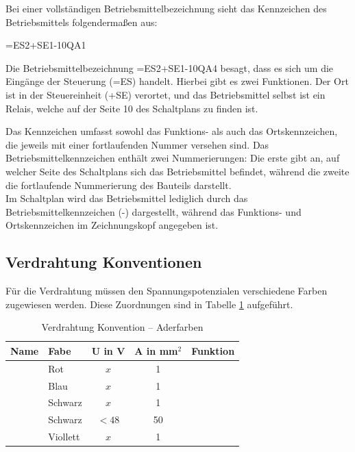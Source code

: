 Bei einer vollständigen Betriebsmittelbezeichnung sieht das Kennzeichen des Betriebsmittels folgendermaßen aus:

\begin{center} =ES2+SE1-10QA1 \end{center}

Die Betriebsmittelbezeichnung =ES2+SE1-10QA4 besagt, dass es sich um die Eingänge der Steuerung (=ES) handelt. Hierbei gibt es zwei Funktionen. Der Ort ist in der Steuereinheit (+SE) verortet, und das Betriebsmittel selbst ist ein Relais, welche auf der Seite 10 des Schaltplans zu finden ist.

Das Kennzeichen umfasst sowohl das Funktions- als auch das Ortskennzeichen, die jeweils mit einer fortlaufenden Nummer versehen sind. Das Betriebsmittelkennzeichen enthält zwei Nummerierungen: Die erste gibt an, auf welcher Seite des Schaltplans sich das Betriebsmittel befindet, während die zweite die fortlaufende Nummerierung des Bauteils darstellt.\\
Im Schaltplan wird das Betriebsmittel lediglich durch das Betriebsmittelkennzeichen (-) dargestellt, während das Funktions- und Ortskennzeichen im Zeichnungskopf angegeben ist.

\newpage

\subsection{Verdrahtung Konventionen}
\label{section:Verdrahtung_Konventionen}
Für die Verdrahtung müssen den Spannungspotenzialen verschiedene Farben zugewiesen werden. Diese Zuordnungen sind in Tabelle \ref{Verdrahtung_Konventionen:tab:Zuordnung} aufgeführt.
\pagebreak[1]
\begin{table}[!ht]
	\centering
	\caption{Verdrahtung Konvention – Aderfarben}
	\label{Verdrahtung_Konventionen:tab:Zuordnung}
	\begin{tabular}{llccl}
		\hline
		\textbf{Name} & \textbf{Fabe}                 & \textbf{U in V} & \textbf{A in mm$^2$} & \textbf{Funktion} \\ \hline
		              & \multicolumn{1}{l|}{Rot}      & $x$             & 1                    &                   \\
		              & \multicolumn{1}{l|}{Blau}     & $x$             & 1                    &                   \\
		              & \multicolumn{1}{l|}{Schwarz}  & $x$             & 1                    &                   \\
		              & \multicolumn{1}{l|}{Schwarz}  & $< 48$          & 50                   &                   \\
		              & \multicolumn{1}{l|}{Viollett} & $x$             & 1                    &                   \\ \hline
	\end{tabular}
\end{table}
\pagebreak[4]




